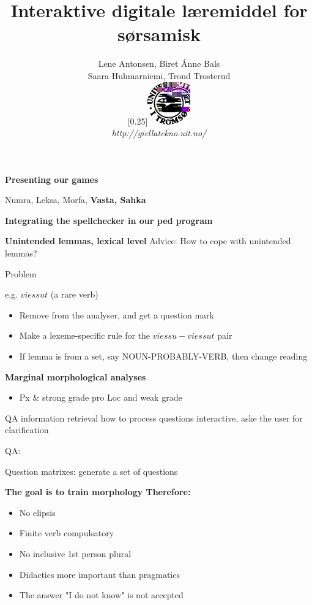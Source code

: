 \documentclass[landscape,norsk,11pt]{seminar}
\title{Interaktive digitale læremiddel for sørsamisk}
\author{Lene Antonsen, Biret Ánne Bals \\
Saara Huhmarniemi, Trond Trosterud \\
  \scalebox{0.25}[0.25]{\includegraphics{img/logoWeb070sh.jpg}} \\
  \textit{http://giellatekno.uit.no/}}
\begin{document}
\begin{slide}

\maketitle

\newslide
\textbf{Presenting our games}

Numra, Leksa, Morfa, \textbf{Vasta, Sahka}

\newslide
\textbf{Integrating the spellchecker in our ped program}


\newslide
\textbf{Unintended lemmas, lexical level}
Advice: How to cope with unintended lemmas?

Problem

e.g. $viessut$ (a rare verb)

\begin{itemize}
\item{Remove from the analyser, and get a question mark}
\item{Make a lexeme-specific rule for the $viessu-viessut$ pair}
\item{If lemma is from a set, say NOUN-PROBABLY-VERB, then change reading}
\end{itemize}


\newslide
\textbf{Marginal morphological analyses}

\begin{itemize}
\item{Px \& strong grade pro Loc and weak grade}
\end{itemize}


\newslide

QA information retrieval how to process questions
interactive, aske the user for clarification

QA: 

Question matrixes: generate a set of questions


\newslide
\textbf{The goal is to train morphology Therefore:}

\begin{itemize}
\item{No elipsis							  }
\item{Finite verb compulsatory}
\item{No inclusive 1st person plural}
\item{Didactics more important than pragmatics}
\item{The answer "I do not know" is not accepted}
\end{itemize}


\end{slide}
\end{document}
